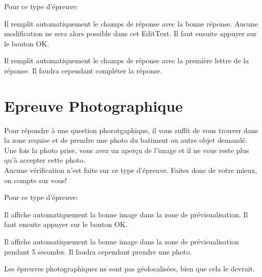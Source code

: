 \documentclass[11pt]{scrreprt}
\begin{document}
    Pour ce type d'épreuve:
        \begin{description}[style=nextline]
            \item[Bouton de triche]Il remplit automatiquement le champs de réponse avec la bonne réponse. Aucune modification ne sera alors possible dans cet EditText. Il faut ensuite appuyer sur le bouton OK.
            \item[Bouton d'aide]Il remplit automatiquement le champs de réponse avec la première lettre de la réponse. Il faudra cependant compléter la réponse.
        \end{description}

    \section{Epreuve Photographique}

    Pour répondre à une question phorotgaphique, il vous suffit de vous trouver dans la zone requise et de prendre une photo du batiment ou autre objet demandé. Une fois la photo prise, vous avez un aperçu de l'image et il ne vous reste plus qu'à accepter cette photo.\\

    Aucune vérification n'est faite sur ce type d'épreuve. Faites donc de votre mieux, on compte sur vous!

    Pour ce type d'épreuve:
    \begin{description}[style=nextline]
        \item[Bouton de triche]Il affiche automatiquement la bonne image dans la zone de prévisualisation. Il faut ensuite appuyer sur le bouton OK.
        \item[Bouton d'aide]Il affiche automatiquement la bonne image dans la zone de prévisualisation pendant 5 secondes. Il faudra cependant prendre une photo.
    \end{description}

    \begin{remarque}
    Les épreuves photographiques ne sont pas géolocalisées, bien que cela le devrait.
    \end{remarque}
\end{document}
